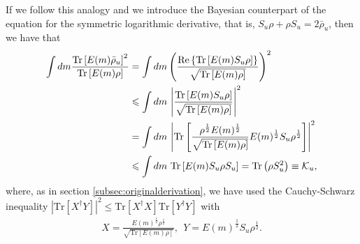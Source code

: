 If we follow this analogy and we introduce the Bayesian counterpart of the equation for the symmetric logarithmic derivative, that is, $S_u \rho + \rho S_u = 2\bar{\rho}_u$, then we have that
\begin{align}
\int dm  \frac{\mathrm{Tr}\left[ E(m) \bar{\rho}_u \right]^2}{\mathrm{Tr}\left[ E(m) \rho \right]} &= \int dm\left(\frac{\mathrm{Re}\left\lbrace\mathrm{Tr}\left[E(m) S_u\rho\right]\right\rbrace}{\sqrt{\mathrm{Tr}\left[ E(m) \rho\right]}}\right)^2
\nonumber \\
&\leqslant \int dm~\abs{\frac{\mathrm{Tr}\left[E(m) S_u\rho\right]}{\sqrt{\mathrm{Tr}\left[ E(m) \rho\right]}}}^2
\nonumber \\
&=\int dm~ \abs{\mathrm{Tr}\left[\frac{\rho^{\frac{1}{2}}E(m)^{\frac{1}{2}}}{\sqrt{\mathrm{Tr}\left[ E(m) \rho \right]}} E(m)^{\frac{1}{2}}S_u \rho^{\frac{1}{2}}\right]}^2
\nonumber \\
&\leqslant  \int dm~ \mathrm{Tr}\left[ E(m) S_u \rho S_u \right] = \mathrm{Tr}\left( \rho S_u^2 \right) \equiv \mathcal{K}_u,
\label{quantuminequalities}
\end{align}
where, as in section \ref{subsec:originalderivation}, we have used the Cauchy-Schwarz inequality $|\mathrm{Tr}[X^\dagger Y ]|^2 \leqslant \mathrm{Tr}[ X^\dagger X ] \mathrm{Tr}[Y^\dagger Y ]$ with 
\begin{eqnarray}
X = \frac{E(m)^{\frac{1}{2}} \rho^{\frac{1}{2}}}{\sqrt{\mathrm{Tr}\left[ E(m) \rho \right]}}, ~~Y = E(m)^{\frac{1}{2}} S_u \rho^{\frac{1}{2}}.
\label{csinequality}
\end{eqnarray}

